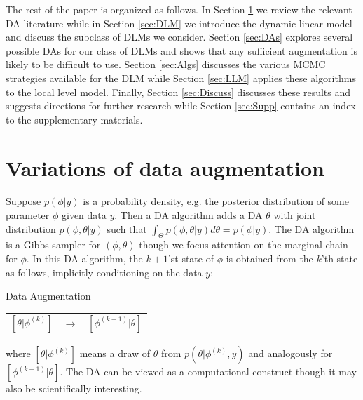 \documentclass[12pt]{article}
\begin{document}
The rest of the paper is organized as follows. In Section \ref{sec:DA} we review the relevant DA literature while in Section \ref{sec:DLM} we introduce the dynamic linear model and discuss the subclass of DLMs we consider. Section \ref{sec:DAs} explores several possible DAs for our class of DLMs and shows that any sufficient augmentation is likely to be difficult to use. Section \ref{sec:Algs} discusses the various MCMC strategies available for the DLM while Section \ref{sec:LLM} applies these algorithms to the local level model. Finally, Section \ref{sec:Discuss} discusses these results and suggests directions for further research while Section \ref{sec:Supp} contains an index to the supplementary materials.

\section{Variations of data augmentation}\label{sec:DA}

Suppose $p(\phi|y)$ is a probability density, e.g. the posterior distribution of some parameter $\phi$ given data $y$. Then a DA algorithm adds a DA $\theta$ with joint distribution $p(\phi,\theta|y)$ such that $\int_{\Theta}p(\phi,\theta|y)d\theta = p(\phi|y)$. The DA algorithm is a Gibbs sampler for $(\phi,\theta)$ though we focus attention on the marginal chain for $\phi$. In this DA algorithm, the $k+1$'st state of $\phi$ is obtained from the $k$'th state as follows, implicitly conditioning on the data $y$:
\begin{alg*}[DA]Data Augmentation\label{alg:DA}
{\small \vspace{-.5cm}
\begin{center}
  \begin{tabular}{lll}
  $[\theta|\phi^{(k)}]$ &$\to$& $[\phi^{(k+1)}|\theta]$
\end{tabular}
\end{center}
}
\end{alg*}
\noindent where $[\theta|\phi^{(k)}]$ means a draw of $\theta$ from $p(\theta|\phi^{(k)},y)$ and  analogously for $[\phi^{(k+1)}|\theta]$. The DA can be viewed as a computational construct though it may also be scientifically interesting. 
\end{document}
